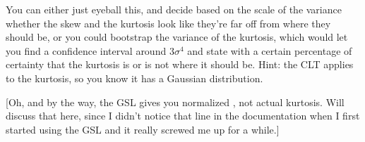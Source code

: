 You can either just eyeball this, and decide based on the scale of the variance
whether the skew and the kurtosis look like they're far off from where they should
be, or you could bootstrap the variance of the kurtosis, which would let you find
a confidence interval around $3 \sigma^4$ and state with a certain percentage
of certainty that the kurtosis is or is not where it should be. Hint: the CLT applies to the kurtosis,
so you know it has a Gaussian distribution.

[Oh, and by the way, the GSL gives you normalized ,
not actual kurtosis.  Will discuss that here, since I didn't notice that
line in the documentation 
when I first started using the GSL and it really screwed me up for a
while.]

